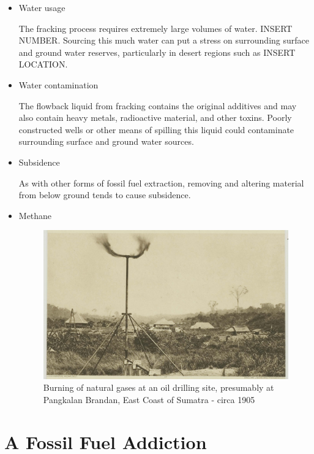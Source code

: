 \begin{itemize}
\item Water usage 

The fracking process requires extremely large volumes of water. INSERT NUMBER. Sourcing this much water can put a stress on surrounding surface and ground water reserves, particularly in desert regions such as INSERT LOCATION.

\item Water contamination 

The flowback liquid from fracking contains the original additives and may also contain heavy metals, radioactive material, and other toxins. Poorly constructed wells or other means of spilling this liquid could contaminate surrounding surface and ground water sources. 



\item Subsidence

As with other forms of fossil fuel extraction, removing and altering material from below ground tends to cause subsidence.

\item Methane

\begin{figure}[h]
	\centering
		\includegraphics[width=1.00\textwidth]{graphics/Burning_of_natural_gases_Sumatra}
	\caption{Burning of natural gases at an oil drilling site, presumably at Pangkalan Brandan, East Coast of Sumatra - circa 1905}
	\label{fig:Burning_of_natural_gases_Pangkalan_Brandan_Sumatra}
\end{figure}


\end{itemize}


\section{A Fossil Fuel Addiction}

